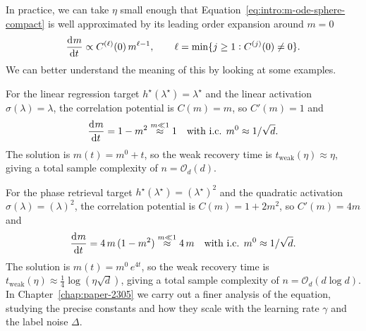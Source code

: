 In practice, we can take \(\eta\) small enough that Equation~\eqref{eq:intro:m-ode-sphere-compact} is well approximated by its leading order expansion around \(m = 0\)
\begin{equation}
\label{eq:intro:approx-m-ode}
    \dod{m}{t} \propto C^{(\ell)}(0)\,m^{\ell-1}, \qquad \ell = \min\{j \geq 1 : C^{(j)}(0) \neq 0\}.
\end{equation}
We can better understand the meaning of this by looking at some examples.
\begin{example}
    For the linear regression target \(h^\star(\lambda^\star) = \lambda^\star\) and the linear activation \(\sigma(\lambda) = \lambda\), the correlation potential is \(C(m) = m\), so \(C'(m) = 1\) and
    \begin{equation}
        \dod{m}{t} = 1 - m^2 \overset{m\ll 1}{\approx} 1\quad \text{with i.c. } m^0 \approx 1/\sqrt{d}.
    \end{equation}
    The solution is \(m(t) = m^0 + t\), so the weak recovery time is \(t_\text{weak}(\eta) \approx \eta\), giving a total sample complexity of \(n = \mathcal{O}_d(d)\).
\end{example}
\begin{example}
    For the phase retrieval target \(h^\star(\lambda^\star) = (\lambda^\star)^2\) and the quadratic activation \(\sigma(\lambda) = (\lambda)^2\), the correlation potential is \(C(m) = 1 + 2m^2\), so \(C'(m) = 4m\) and
    \begin{equation}
        \dod{m}{t} = 4\,m\,(1 - m^2) \overset{m\ll 1}{\approx} 4\,m\quad \text{with i.c. } m^0 \approx 1/\sqrt{d}.
    \end{equation}
    The solution is \(m(t) = m^0\,e^{4t}\), so the weak recovery time is \(t_\text{weak}(\eta) \approx \frac{1}{4}\log(\eta\sqrt{d})\), giving a total sample complexity of \(n = \mathcal{O}_d(d\log d)\).
    In Chapter~\ref{chap:paper-2305} we carry out a finer analysis of the equation, studying the precise constants and how they scale with the learning rate \(\gamma\) and the label noise \(\Delta\).
\end{example}
